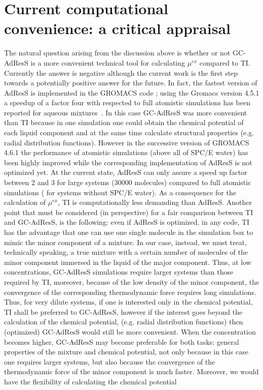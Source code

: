 \documentclass[a4paper,preprint,unsortedaddress]{revtex4-1}
\newcommand{\recheck}[1]{{\color{red} #1}}
\begin{document}
\section{Current computational convenience: a critical appraisal}
The natural question arising from the discussion above is whether or not GC-AdResS is a more convenient technical tool for calculating $\mu^{ex}$ compared to TI.
Currently the answer is negative although the current work is the first step towards a potentially positive answer for the future. In fact, the fastest version of AdResS is implemented in the GROMACS code \cite{gromacs}; using the Gromacs version 4.5.1 a speedup of a factor four with respected to full atomistic simulations has been reported for aqueous mixtures~\cite{debashish1,nico-debashish}. In this case GC-AdResS was more convenient than TI because in one simulation one could obtain the chemical potential of each liquid component and at the same time calculate structural properties (e.g. radial distribution functions). However in the successive version of GROMACS 4.6.1 the performance of atomistic simulations (above all of SPC/E water) has been highly improved while the corresponding implementation of AdResS is not optimized yet. At the current state, AdResS can only assure a speed up factor between \recheck{2 and 3} for large systems (30000 molecules) compared to full atomistic simulations \recheck{( for systems without SPC/E water)}. As a consequence for the calculation of $\mu^{ex}$, TI is computationally less demanding than AdResS. Another point that must be considered (in perspective) for a fair comparison between TI and GC-AdResS, is the following: even if AdResS is optimized, in any code, TI has the advantage that one can use one single molecule in the simulation box to mimic the minor component of a mixture. In our case, instead, we must treat, technically speaking, a true mixture with a certain number of molecules of the minor component immersed in the liquid of the major component. Thus, at low concentrations, GC-AdResS simulations require larger systems than those required by TI, moreover, because of the low density of the minor component, the convergence of the corresponding thermodynamic force requires long simulations. 
Thus, for very dilute systems, if one is interested only in the chemical potential, TI shall be preferred to GC-AdResS, however if the interest goes beyond the calculation of the chemical potential, (e.g. radial distribution functions) then (optimized) GC-AdResS would still be more convenient.
When the concentration becomes higher, GC-AdResS may become preferable for both tasks: general properties of the mixture and chemical potential, not only because in this case one requires larger systems, but also because the convergence of the thermodynamic force of the minor component is much faster. Moreover, we would have the flexibility of calculating the chemical potential
\end{document}
